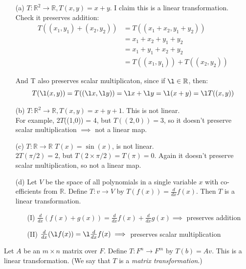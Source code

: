 \documentclass[twoside]{scrartcl}
\begin{document}
\begin{examples}
\begin{itemize}
\item[(a)] $T: \mathbb{R}^2 \to \mathbb{R}, T(x,y) = x+y$. I claim this is a linear transformation.\\
Check it preserves addition: \[
\begin{aligned}
T( (x_1, y_1) + (x_2,y_2) ) &= T ((x_1 + x_2, y_1  + y_2))\\
&= x_1 + x_2 + y_1 + y_2 \\
&= x_1 + y_1 + x_2 + y_2 \\
&= T((x_1,y_1)) + T((x_2,y_2))
\end{aligned}\]

And T also preserves scalar multiplicaton, since if $\l \in \mathbb{R}$, then:
\[
T(\l(x,y)) = T((\l x,\l y)) = \l x + \l y = \l(x+y) = \l T((x,y))\]


\item[(b)] $T: \mathbb{R}^2 \to \mathbb{R}, T(x,y) = x+y + 1$. This is not linear. \\
For example, 2$T$((1,0)) = 4, but $T((2,0)) = 3$, so it doesn't preserve scalar multiplication $\implies$ not a linear map.

\item[(c)] $T: \mathbb{R} \to \mathbb{R}$ $T(x) = \sin(x)$, is not linear.\\
$2T(\pi/2) = 2$, but $T(2\times \pi/2) = T(\pi) = 0$. Again it doesn't preserve scalar multiplication, so not a linear map.

\item[(d)] Let $V$ be the space of all polynomials in a single variable $x$ with co-efficients from $\mathbb{R}$. Define $T:v \to V$ by $T(f(x)) = \frac{d}{dx}f(x)$. Then $T$ is a linear transformation.
\begin{itemize}
\item[(I)] $\frac{d}{dx}(f(x) + g(x)) = \frac{d}{dx}f(x) + \frac{d}{dx}g(x) \implies$ preserves addition
\item[(II)] $\frac{d}{dx}(\l f(x)) = \l\frac{d}{dx}f(x) \implies $ preserves scalar multiplication
\end{itemize}

\end{itemize}
\end{examples}\vspace*{10pt}

\begin{proposition} Let $A$ be an $m\times n$ matrix over $F$. Define $T: F^n \to F^m$ by $T(b) = Av$. This is a linear transformation. (We say that $T$ is a \emph{matrix transformation}.)	
\end{proposition}
\end{document}
